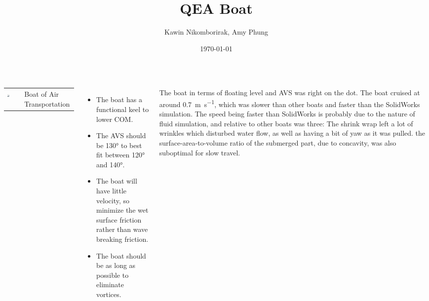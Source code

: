 \documentclass[17pt, a2paper, landscape]{tikzposter}
\title{QEA Boat}
\author{Kawin Nikomborirak, Amy Phung}
\date{\today}
\begin{document}
\maketitle

\begin{columns}

  {
    \begin{tabularx}{0.4\textwidth}{l X}
    \includegraphics[width=0.18\textwidth]{FinishedBoat.jpg} &
    Boat of Air Transportation
    \end{tabularx}
  }

  {
    \begin{itemize}
    \item The boat has a functional keel to lower COM.
    \item The AVS should be \ang{130} to best fit between \ang{120} and \ang{140}.
    \item The boat will have little velocity, so minimize the wet surface friction rather than wave breaking friction.
    \item The boat should be as long as possible to eliminate vortices.
    \end{itemize}
  }



  {
    The boat in terms of floating level and AVS was right on the dot.
    The boat cruised at around \SI{.7}{\meter\per\second}, which was slower than other boats and faster than the SolidWorks simulation.
    The speed being faster than SolidWorks is probably due to the nature of fluid simulation, and relative to other boats was three:
    The shrink wrap left a lot of wrinkles which disturbed water flow, as well as having a bit of yaw as it was pulled.
    the surface-area-to-volume ratio of the submerged part, due to concavity, was also suboptimal for slow travel.
  }


\end{columns}
\end{document}
